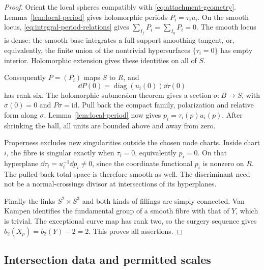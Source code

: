 \begin{proof}
Orient the local spheres compatibly with
\eqref{eq:attachment-geometry}. Lemma~\ref{lem:local-period}
gives holomorphic periods $P_i=\tau_i u_i$. On the smooth locus,
\eqref{eq:integral-period-relations} gives
$\sum_{I_f}P_i=\sum_{I_g}P_i=0$. The smooth locus is dense:
the smooth base integrates a full-support smoothing tangent, or,
equivalently, the finite union of the nontrivial hypersurfaces
$\{\tau_i=0\}$ has empty interior. Holomorphic extension gives
these identities on all of $S$.

Consequently $P=(P_i)$ maps $S$ to $R$, and
\[
 \dd P(0)=\operatorname{diag}(u_i(0))\dd\tau(0)
\]
has rank six. The holomorphic submersion theorem gives a section
$\sigma:B\to S$, with $\sigma(0)=0$ and $P\sigma=\mathrm{id}$.
Pull back the compact family, polarization and relative form along
$\sigma$. Lemma~\ref{lem:local-period} now gives
$p_i=\tau_i(p)u_i(p)$. After shrinking the ball, all units are
bounded above and away from zero.

Properness excludes new singularities outside the chosen node charts.
Inside chart $i$, the fibre is singular exactly when $\tau_i=0$,
equivalently $p_i=0$. On that hyperplane
$\dd\tau_i=u_i^{-1}\dd p_i\ne0$, since the coordinate functional
$p_i$ is nonzero on $R$. The pulled-back total space is therefore
smooth as well. The discriminant need not be a normal-crossings divisor
at intersections of its hyperplanes.

Finally the links $S^2\times S^3$ and both kinds of fillings are
simply connected. Van Kampen identifies the fundamental group of a
smooth fibre with that of $Y$, which is trivial. The exceptional
curve map has rank two, so the surgery sequence gives
$b_2(X_p)=b_2(Y)-2=2$. This proves all assertions.
\end{proof}

\subsection{Intersection data and permitted scales}

